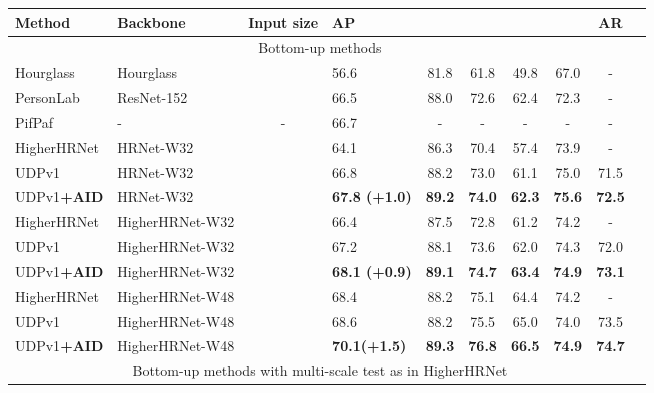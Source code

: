 \documentclass[final]{cvpr}
\begin{document}
\begin{table*}
\footnotesize
\begin{center}
\begin{tabular}{l|l|c|lcccccc}

\hline
Method                           & Backbone       &Input size      &AP   &  &  &  & &AR  \\
\hline
\multicolumn{9}{c}{Bottom-up methods}\\
\hline
Hourglass \cite{AssociativeEmbedding}& Hourglass   &    &56.6                  & 81.8              & 61.8         & 49.8          &67.0           &-   \\
PersonLab \cite{PersonLab}         & ResNet-152    &  &66.5                  & 88.0              & 72.6         & 62.4          &72.3           &-\\
PifPaf \cite{PIFPAF}               & -             &-                 &66.7                  & -                 & -            &-              &-              &-    \\
HigherHRNet \cite{Higher}          & HRNet-W32     &    &64.1                  & 86.3              & 70.4         & 57.4          &73.9           &-\\
UDPv1 \cite{UDP}                   & HRNet-W32     &    &66.8                  & 88.2              & 73.0         & 61.1          &75.0           &71.5\\
UDPv1\textbf{+AID}                & HRNet-W32     &    &\textbf{67.8 (+1.0)}   &\textbf{89.2}      &\textbf{74.0} &\textbf{62.3}  &\textbf{75.6}  &\textbf{72.5}\\
HigherHRNet \cite{Higher}          &HigherHRNet-W32&    &66.4                  & 87.5              & 72.8         & 61.2          &74.2           &-\\
UDPv1 \cite{UDP}                   &HigherHRNet-W32&    &67.2                  & 88.1              & 73.6         & 62.0          &74.3           &72.0\\
UDPv1\textbf{+AID}                &HigherHRNet-W32&    &\textbf{68.1 (+0.9)}   &\textbf{89.1}      &\textbf{74.7} &\textbf{63.4}  &\textbf{74.9}  &\textbf{73.1}\\
HigherHRNet \cite{Higher}          &HigherHRNet-W48&    &68.4                  & 88.2              & 75.1         & 64.4          &74.2           &-\\
UDPv1\cite{UDP}                   &HigherHRNet-W48&    &68.6                  & 88.2              & 75.5         & 65.0          &74.0           &73.5\\
UDPv1\textbf{+AID}                &HigherHRNet-W48&    &\textbf{70.1(+1.5)}   &\textbf{89.3}      &\textbf{76.8} &\textbf{66.5}  &\textbf{74.9}  &\textbf{74.7}\\
\hline
\multicolumn{9}{c}{Bottom-up methods with multi-scale test as in HigherHRNet \cite{Higher}}\\
\hline


\end{tabular}
\end{center}
\end{table*}
\end{document}
